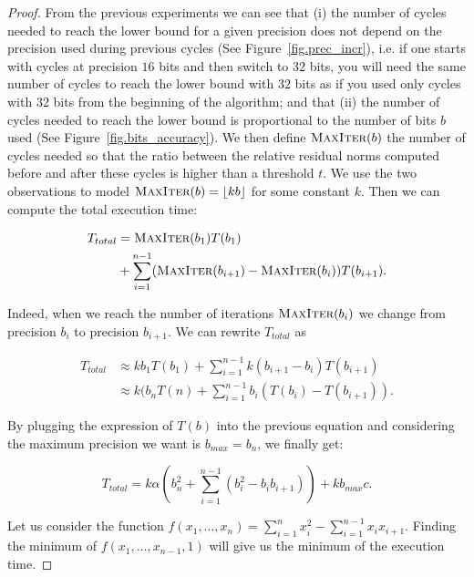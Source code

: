 \begin{proof}

    From the previous experiments we can see that (i) the number of cycles
    needed to reach the lower bound for a given precision does not depend on
    the precision used during previous cycles (See Figure~\ref{fig.prec_incr}),
    i.e.  if one starts with cycles at precision $16$ bits and then switch to
    $32$ bits, you will need the same number of cycles to reach the lower bound
    with $32$ bits as if you used only cycles with $32$ bits from the beginning
    of the algorithm; and that (ii) the number of cycles needed to reach the
    lower bound is proportional to the number of bits $b$ used (See
    Figure~\ref{fig.bits_accuracy}). We then define $\textsc{MaxIter}(b)$ the
    number of cycles needed so that the ratio between the relative
    residual norms computed before and after these cycles is higher than a threshold $t$. 
    We use the two observations
    to model $\textsc{MaxIter}(b) = \lfloor kb \rfloor$ for some constant $k$.
    Then we can compute the total execution time:

    \begin{align*}
        T_{total}& = \textsc{MaxIter}(b_1)T(b_1)\\ & +  \sum\limits_{i=1}^{n-1}
        (\textsc{MaxIter}(b_{i+1})-\textsc{MaxIter}(b_i))T(b_{i+1}).
    \end{align*}

    Indeed, when we reach the number of iterations $\textsc{MaxIter}(b_i)$ we
    change from precision $b_i$ to precision $b_{i+1}$.  We can rewrite
    $T_{total}$ as

    \begin{align*}
        T_{total} &\approx k b_{1} T(b_1) + \sum\limits_{i=1}^{n-1}
        k(b_{i+1}-b_{i})T(b_{i+1})\\ & \approx k ( b_{n}T(n) +
        \sum\limits_{i=1}^{n-1} b_i ( T(b_i) - T(b_{i+1})).
    \end{align*}

    By plugging the expression of $T(b)$ into the previous equation and considering
    the maximum precision we want is $b_{max}=b_n$, we finally get:

    \begin{equation}
        T_{total}  = k\alpha\left(b_n^2 + \sum\limits_{i=1}^{n-1} (b_i^2 - b_i b_{i+1})\right) + kb_{max}c.
    \end{equation}

    Let us consider the function $f(x_1,\dots,x_n) = \sum\limits_{i=1}^n x_i^2
    - \sum\limits_{i=1}^{n-1} x_ix_{i+1}$. Finding the minimum of
    $f(x_1,\dots,x_{n-1},1)$ will give us the minimum of the execution time.


\end{proof}
